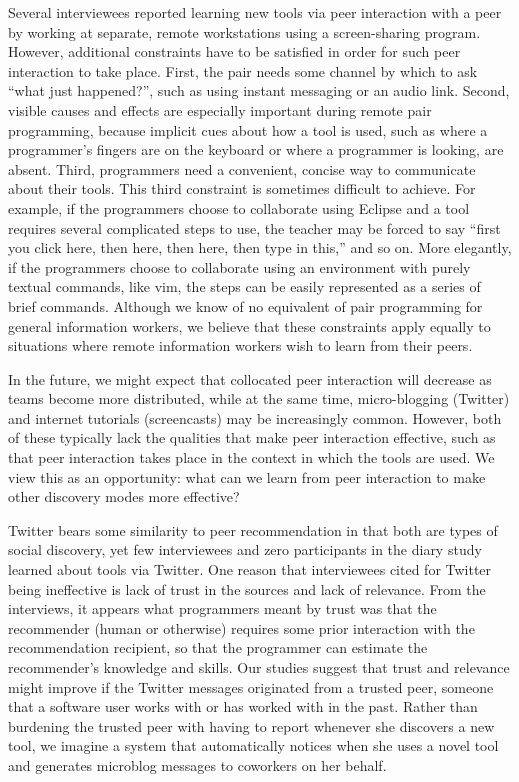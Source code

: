\documentclass[smallextended]{svjour3}
\newcommand\discovery{peer interaction\xspace}
\newcommand\DisCovery{Peer Interaction\xspace}
\newcommand\discpush{peer recommendation\xspace}
\newcommand\contexts{modes\xspace}
\begin{document}
Several interviewees reported learning new tools via \discovery with
a peer by working at separate, remote workstations using
a screen-sharing program.
However, additional constraints have to be satisfied in order for such
\discovery to take place.
First, the pair needs some channel by which to ask ``what just happened?'', 
such as using instant messaging or an audio link.
Second, visible causes and effects are especially important during remote pair
programming, because implicit cues about how a tool is used, such as where a
programmer's fingers are on the keyboard or where a programmer is looking, are
absent. 
Third, programmers need a convenient, concise way to communicate about their
tools.
This third constraint is sometimes difficult to achieve.
For example, if the programmers choose to collaborate using Eclipse
and a tool requires several complicated steps to use, the teacher may be
forced to say ``first you click here, then here, then here, then type in
this,'' and so on. 
More elegantly, if the programmers choose to collaborate using an
environment with purely textual commands, like vim, the steps can be easily
represented as a series of brief commands.
Although we know of no equivalent of pair programming for general 
information workers, we believe that these constraints apply equally
to situations where remote information workers wish to learn from
their peers.

\paraHead{Learning from the Strengths of \DisCovery.}
In the future, we might expect that collocated \discovery will
decrease as teams become more distributed, while at the same time, 
micro-blogging (Twitter) and internet tutorials (screencasts) 
may be increasingly common.
However, both of these typically lack the qualities that make
\discovery effective, such as that \discovery takes place in the context 
in which the tools are used.
We view this as an opportunity: what can we learn from \discovery to make
other discovery \contexts more effective?

Twitter bears some similarity to \discpush in that
both are types of social discovery, yet few interviewees and 
zero participants in the diary study learned about tools via Twitter.
One reason that interviewees cited for Twitter being ineffective is lack of trust
in the sources and lack of relevance.
From the interviews, it appears what programmers meant by trust was that the
recommender (human or otherwise) requires some prior interaction with the
recommendation recipient, so that the programmer can estimate the recommender's knowledge and
skills.
Our studies suggest that trust and relevance might improve if the Twitter
messages originated from a trusted peer, someone that a software user works with
or has worked with in the past.
Rather than burdening the trusted peer with having to report whenever she
discovers a new tool, we imagine a system that automatically notices when she
uses a novel tool and generates microblog messages to coworkers on her behalf.
\end{document}
